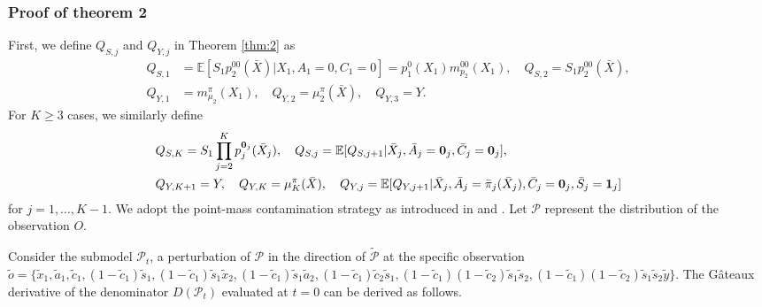 \documentclass{article}
\newcommand{\E}{\mathbb{E}}
\newcommand{\tred}{{}}   %
\begin{document}
\subsubsection{Proof of theorem 2} \label{app:thm2}
\tred{
First, we define $Q_{S,j}$ and $Q_{Y,j}$ in Theorem \ref{thm:2} as
\begin{align*}
	Q_{S,1} &= \E[S_1p_2^{00}(\bar X)|X_1, A_1=0, C_1=0] = p_1^0(X_1)m_{p_2}^{00}(X_1), \quad
	Q_{S,2} = S_1p_2^{00}(\bar X), \\
	Q_{Y,1} &= m_{\mu_2}^\pi(X_1), \quad 
	Q_{Y,2} = \mu_2^\pi(\bar X), \quad 
	Q_{Y,3} = Y.
\end{align*}
%
For $K \ge 3$ cases, we similarly define
\begin{align*}
	&Q_{S,K} = S_1\prod_{j=2}^K p_j^{{\bf 0}_j}(\bar X_j), \quad 
	 Q_{S,j} = \E[ Q_{S,j+1} | \bar X_j, \bar A_j = {\bf0}_j, \bar C_j = {\bf0}_j], \\
	&Q_{Y,K+1} = Y, \quad 
	 Q_{Y,K} = \mu_K^\pi(\bar X), \quad
	Q_{Y,j} = \E[Q_{Y,j+1} | \bar X_j, \bar A_j = \bar\pi_j(\bar X_j), \bar C_j = {\bf0}_j, \bar S_j = {\bf1}_j]
\end{align*}
for $j=1,\dots,K-1$.
}
We adopt the point-mass contamination strategy as introduced in \cite{Hines2021} and \cite{kennedy2023semiparametric}. Let $\mathcal P$ represent the distribution of the observation $O$.

Consider the submodel $\mathcal P_t$, a perturbation of $\mathcal P$ in the direction of $\widetilde{\mathcal P}$ at the specific observation $\tilde o = \{\tilde x_1, \tilde a_1, \tilde c_1, (1-\tilde c_1)\tilde s_1, (1-\tilde c_1)\tilde s_1\tilde x_2, (1-\tilde c_1)\tilde s_1\tilde a_2, (1-\tilde c_1)\tilde c_2\tilde s_1, (1-\tilde c_1)(1-\tilde c_2)\tilde s_1\tilde s_2, (1-\tilde c_1)(1-\tilde c_2)\tilde s_1\tilde s_2\tilde y\}$. The G\^ateaux derivative of the denominator $D(\mathcal P_t)$ evaluated at $t=0$ can be derived as follows.
\end{document}
